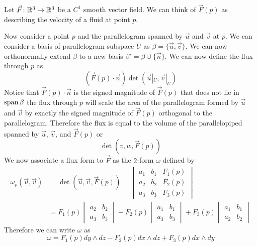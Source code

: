 \documentclass[notes]{subfiles}
\begin{document}
\begin{example}
    Let $\vec{F}\colon \mathbb{R}^3 \to \mathbb{R}^3$ be a $C^1$ smooth vector field. We can think of $\vec{F}(p)$ as describing the velocity of a fluid at point $p$.

    Now consider a point $p$ and the parallelogram spanned by $\vec{u}$ and $\vec{v}$ at $p$. We can consider a basis of parallelogram subspace $U$ as $\beta = \{ \vec{u}, \vec{v} \}$. We can now orthonormally extend $\beta$ to a new basis $\beta' = \beta \cup \{ \vec{n} \}$. We can now define the flux through $p$ as
    \[
        (\vec{F}(p)\cdot\vec{n})\det(\vec{u}|_U, \vec{v}|_U)
    \]
    Notice that $\vec{F}(p)\cdot\vec{n}$ is the signed magnitude of $\vec{F}(p)$ that does not lie in $\operatorname{span} \beta$ the flux through $p$ will scale the area of the parallelogram formed by $\vec{u}$ and $\vec{v}$ by exactly the signed magnitude of $\vec{F}(p)$ orthogonal to the parallelogram. Therefore the flux is equal to the volume of the parallelopiped spanned by $\vec{u}$, $\vec{v}$, and $\vec{F}(p)$ or
    \[
        \det(v, w, \vec{F}(p))
    \]
    We now associate a flux form to $\vec{F}$ as the $2$-form $\omega$ defined by
    \begin{align*}
        \omega_p(\vec{u}, \vec{v})
        &= \det(\vec{u}, \vec{v}, \vec{F}(p))
        = \begin{vmatrix}
            a_1 & b_1 & F_1(p) \\
            a_2 & b_2 & F_2(p) \\
            a_3 & b_3 & F_3(p)
        \end{vmatrix} \\
        &= F_1(p)\begin{vmatrix}
            a_2 & b_2 \\
            a_3 & b_3
        \end{vmatrix}
        - F_2(p)\begin{vmatrix}
            a_1 & b_1 \\
            a_3 & b_3
        \end{vmatrix}
        + F_3(p)\begin{vmatrix}
            a_1 & b_1 \\
            a_2 & b_2
        \end{vmatrix}
    \end{align*}
    Therefore we can write $\omega$ as
    \[
        \omega = F_1(p)dy\wedge dz - F_2(p)dx\wedge dz + F_3(p)dx \wedge dy
    \]
\end{example}
\end{document}
